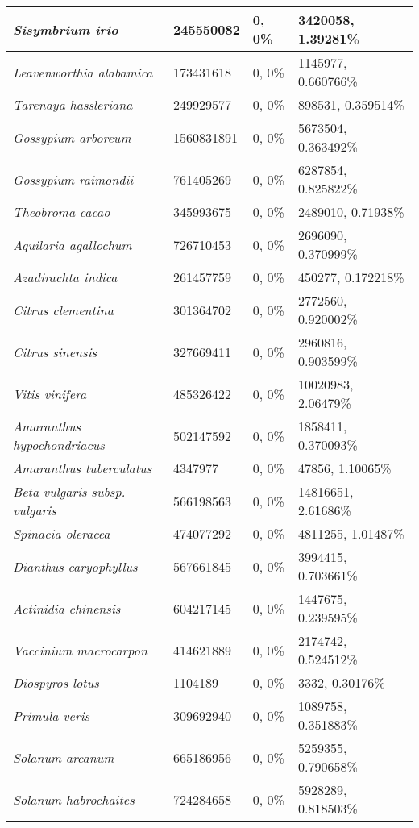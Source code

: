 {\begin{longtable}{| L{4cm} | L{2.7cm}  | L{3.7cm} | L{3.7cm} |}
\textit{Sisymbrium irio} & 245550082 & 0, 0\% & 3420058, 1.39281\% \\ \hline
\textit{Leavenworthia alabamica} & 173431618 & 0, 0\% & 1145977, 0.660766\% \\ \hline
\textit{Tarenaya hassleriana} & 249929577 & 0, 0\% & 898531, 0.359514\% \\ \hline
\textit{Gossypium arboreum} & 1560831891 & 0, 0\% & 5673504, 0.363492\% \\ \hline
\textit{Gossypium raimondii} & 761405269 & 0, 0\% & 6287854, 0.825822\% \\ \hline
\textit{Theobroma cacao} & 345993675 & 0, 0\% & 2489010, 0.71938\% \\ \hline
\textit{Aquilaria agallochum} & 726710453 & 0, 0\% & 2696090, 0.370999\% \\ \hline
\textit{Azadirachta indica} & 261457759 & 0, 0\% & 450277, 0.172218\% \\ \hline
\textit{Citrus clementina} & 301364702 & 0, 0\% & 2772560, 0.920002\% \\ \hline
\textit{Citrus sinensis} & 327669411 & 0, 0\% & 2960816, 0.903599\% \\ \hline
\textit{Vitis vinifera} & 485326422 & 0, 0\% & 10020983, 2.06479\% \\ \hline
\textit{Amaranthus hypochondriacus} & 502147592 & 0, 0\% & 1858411, 0.370093\% \\ \hline
\textit{Amaranthus tuberculatus} & 4347977 & 0, 0\% & 47856, 1.10065\% \\ \hline
\textit{Beta vulgaris subsp. vulgaris} & 566198563 & 0, 0\% & 14816651, 2.61686\% \\ \hline
\textit{Spinacia oleracea} & 474077292 & 0, 0\% & 4811255, 1.01487\% \\ \hline
\textit{Dianthus caryophyllus} & 567661845 & 0, 0\% & 3994415, 0.703661\% \\ \hline
\textit{Actinidia chinensis} & 604217145 & 0, 0\% & 1447675, 0.239595\% \\ \hline
\textit{Vaccinium macrocarpon} & 414621889 & 0, 0\% & 2174742, 0.524512\% \\ \hline
\textit{Diospyros lotus} & 1104189 & 0, 0\% & 3332, 0.30176\% \\ \hline
\textit{Primula veris} & 309692940 & 0, 0\% & 1089758, 0.351883\% \\ \hline
\textit{Solanum arcanum} & 665186956 & 0, 0\% & 5259355, 0.790658\% \\ \hline
\textit{Solanum habrochaites} & 724284658 & 0, 0\% & 5928289, 0.818503\% \\ \hline

\end{longtable}}
